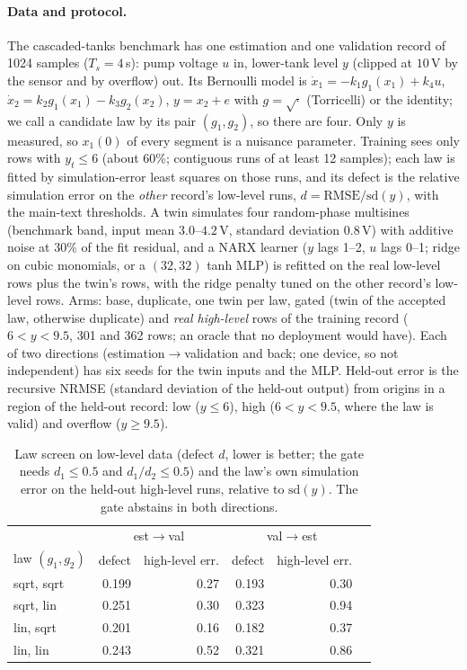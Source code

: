 \paragraph{Data and protocol.} The cascaded-tanks benchmark \citep{schoukens2017three,schoukens2016tanks} has one estimation and one validation record of 1024 samples ($T_s=4$\,s): pump voltage $u$ in, lower-tank level $y$ (clipped at $10$\,V by the sensor and by overflow) out. Its Bernoulli model is $\dot x_1=-k_1g_1(x_1)+k_4u$, $\dot x_2=k_2g_1(x_1)-k_3g_2(x_2)$, $y=x_2+e$ with $g=\sqrt{\cdot}$ (Torricelli) or the identity; we call a candidate law by its pair $(g_1,g_2)$, so there are four. Only $y$ is measured, so $x_1(0)$ of every segment is a nuisance parameter. Training sees only rows with $y_t\le6$ (about 60\%; contiguous runs of at least 12 samples); each law is fitted by simulation-error least squares on those runs, and its defect is the relative simulation error on the \emph{other} record's low-level runs, $d=\mathrm{RMSE}/\mathrm{sd}(y)$, with the main-text thresholds. A twin simulates four random-phase multisines (benchmark band, input mean $3.0$--$4.2$\,V, standard deviation $0.8$\,V) with additive noise at 30\% of the fit residual, and a NARX learner ($y$ lags 1--2, $u$ lags 0--1; ridge on cubic monomials, or a $(32,32)$ tanh MLP) is refitted on the real low-level rows plus the twin's rows, with the ridge penalty tuned on the other record's low-level rows. Arms: base, duplicate, one twin per law, gated (twin of the accepted law, otherwise duplicate) and \emph{real high-level} rows of the training record ($6<y<9.5$, 301 and 362 rows; an oracle that no deployment would have). Each of two directions (estimation$\to$validation and back; one device, so not independent) has six seeds for the twin inputs and the MLP. Held-out error is the recursive NRMSE (standard deviation of the held-out output) from origins in a region of the held-out record: low ($y\le6$), high ($6<y<9.5$, where the law is valid) and overflow ($y\ge9.5$).

\begin{table}[h]
\centering\small
\caption{Law screen on low-level data (defect $d$, lower is better; the gate needs $d_1\le0.5$ and $d_1/d_2\le0.5$) and the law's own simulation error on the held-out high-level runs, relative to $\mathrm{sd}(y)$. The gate abstains in both directions.}
\label{tab:tanks-laws}
\begin{tabular}{lrrrrr}
\toprule
 & \multicolumn{2}{c}{est$\to$val} & \multicolumn{2}{c}{val$\to$est}\\
law $(g_1,g_2)$ & defect & high-level err. & defect & high-level err.\\
\midrule
sqrt, sqrt & 0.199 & 0.27 & 0.193 & 0.30\\
sqrt, lin & 0.251 & 0.30 & 0.323 & 0.94\\
lin, sqrt & 0.201 & 0.16 & 0.182 & 0.37\\
lin, lin & 0.243 & 0.52 & 0.321 & 0.86\\
\bottomrule
\end{tabular}
\end{table}

